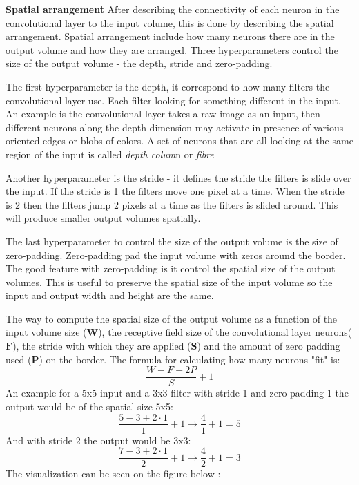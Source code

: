 \textbf{Spatial arrangement}
After describing the connectivity of each neuron in the convolutional layer to the input volume, this is done by describing the spatial arrangement. Spatial arrangement include how many neurons there are in the output volume and how they are arranged. Three hyperparameters control the size of the output volume - the depth, stride and zero-padding. 

The first hyperparameter is the depth, it correspond to how many filters the convolutional layer use. Each filter looking for something different in the input. An example is the convolutional layer takes a raw image as an input, then different neurons along the depth dimension may activate in presence of various oriented edges or blobs of colors. A set of neurons that are all looking at the same region of the input is called \textit{depth colum}n or \textit{fibre}

Another hyperparameter is the stride - it defines the stride the filters is slide over the input. If the stride is 1 the filters move one pixel at a time. When the stride is 2 then the filters jump 2 pixels at a time as the filters is slided around. This will produce smaller output volumes spatially.

The last hyperparameter to control the size of the output volume is the size of zero-padding. Zero-padding pad the input volume with zeros around the border. The good feature with zero-padding is it control the spatial size of the output volumes. This is useful to preserve the spatial size of the input volume so the input and output width and height are the same. 

The way to compute the spatial size of the output volume as a function of the input volume size ($\textbf{W}$), the receptive field size of the convolutional layer neurons($\textbf{F}$), the stride with which they are applied ($\textbf{S}$) and the amount of zero padding used ($\textbf{P}$) on the border. The formula for calculating how many neurons "fit" is:
\begin{equation}
\frac{W-F+2P}{S}+1
\end{equation}    
An example for a 5x5 input and a 3x3 filter with stride 1 and zero-padding 1 the output would be of the spatial size 5x5:
\begin{equation}
\frac{5-3+2\cdot1 }{1}+1         \rightarrow             \frac{4}{1}+1 =5
\end{equation} 
And with stride 2 the output would be 3x3:
\begin{equation}
\frac{7-3+2\cdot1 }{2}+1         \rightarrow             \frac{4}{2}+1 =3
\end{equation} 
The visualization can be seen on the figure below : 

